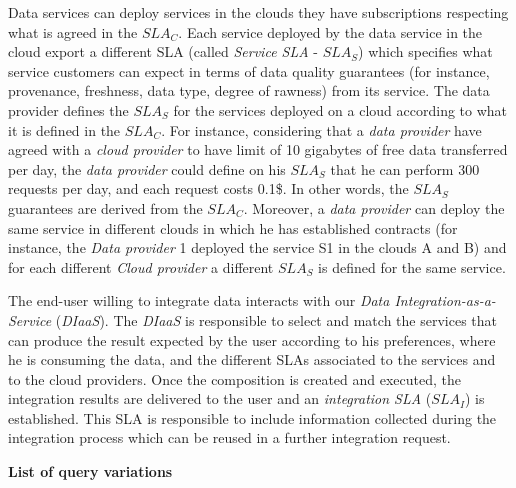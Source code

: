 \documentclass[12pt,a4paper,oneside]{article}
\theoremstyle{definition}
\begin{document}
Data services can deploy services in the clouds they have subscriptions respecting what is agreed in the $SLA_{C}$. Each service deployed by the data service in the cloud export a different SLA (called \textsl{Service SLA} - $SLA_{S}$) which specifies what service customers can expect in terms of data quality guarantees (for instance, provenance, freshness, data type, degree of rawness) from its service. The data provider defines the $SLA_{S}$ for the services deployed on a cloud according to what it is defined in the $SLA_{C}$. For instance, considering that a \textsl{data provider} have agreed with a \textsl{cloud provider} to have limit of 10 gigabytes of free data transferred per day, the \textsl{data provider} could define on his $SLA_{S}$ that he can perform 300 requests per day, and each request costs 0.1\$. In other words, the $SLA_{S}$ guarantees are derived from the $SLA_{C}$. Moreover, a \textsl{data provider} can deploy the same service in different clouds in which he has established contracts (for instance, the \textsl{Data provider} 1 deployed the service S1 in the clouds A and B) and for each different \textsl{Cloud provider} a different $SLA_{S}$ is defined for the same service.

The end-user willing to integrate data interacts with our \textsl{Data Integration-as-a-Service} (\textsl{DIaaS}). The \textsl{DIaaS} is responsible to select and match the services that can produce the result expected by the user according to his preferences, where he is consuming the data, and the different SLAs associated to the services and to the cloud providers. Once the composition is created and executed, the integration results are delivered to the user and an \textsl{integration SLA} ($SLA_{I}$) is established. This SLA is responsible to include information collected during the integration process which can be reused in a further integration request.



\begin{flushleft}
\textbf{List of query variations}
\end{flushleft}
\end{document}
